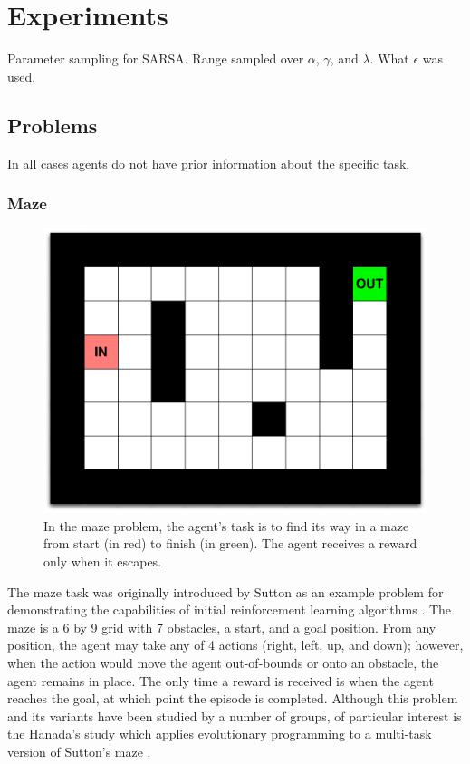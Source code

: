 \section{Experiments}

Parameter sampling for SARSA. Range sampled over $\alpha$, $\gamma$, and $\lambda$. What $\epsilon$ was used.

\subsection{Problems}

In all cases agents do not have prior information about the specific task.

\subsubsection{Maze}
\begin{figure}[h]
\center
\includegraphics[width=0.75\linewidth]{MZ_problem.pdf}
\caption{In the maze problem, the agent's task is to find its way in a maze from start (in red) to finish (in green). The agent receives a reward only when it escapes.}\label{fig:MC:problem}
\end{figure}

The maze task was originally introduced by Sutton as an example problem for demonstrating the capabilities of initial reinforcement learning algorithms \cite{Sutton1990}. The maze is a 6 by 9 grid with 7 obstacles, a start, and a goal position. From any position, the agent may take any of 4 actions (right, left, up, and down); however, when the action would move the agent out-of-bounds or onto an obstacle, the agent remains in place. The only time a reward is received is when the agent reaches the goal, at which point the episode is completed. Although this problem and its variants have been studied by a number of groups, of particular interest is the Hanada's study which applies evolutionary programming to a multi-task version of Sutton's maze \cite{Handa2007}.

